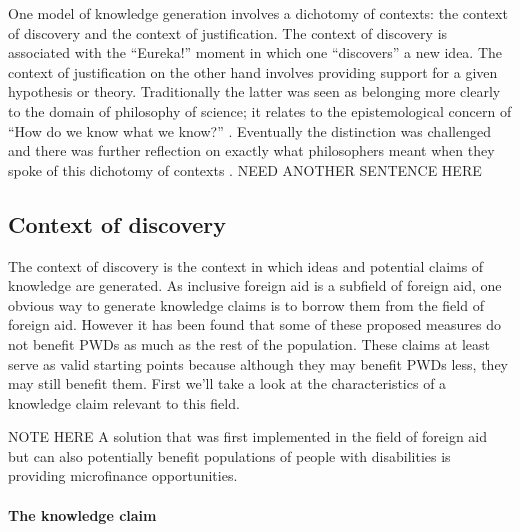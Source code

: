 \documentclass[a4paper]{article}
\begin{document}
One model of knowledge generation involves a dichotomy of contexts: the
context of discovery and the context of justification. The context of
discovery is associated with the ``Eureka!'' moment in which one ``discovers''
a new idea. The context of justification on the other hand involves providing
support for a given hypothesis or theory. Traditionally the latter was seen as
belonging more clearly to the domain of philosophy of science; it relates to
the epistemological concern of ``How do we know what we know?''
\citep{schickore2014scientific}. Eventually the distinction was challenged and
there was further reflection on exactly what philosophers meant when they
spoke of this dichotomy of contexts \citep{hoyningen2006context}. 
NEED ANOTHER SENTENCE HERE

\subsection{Context of discovery}

The context of discovery is the context in which ideas and potential claims of
knowledge are generated. As inclusive foreign aid is a subfield of foreign
aid, one obvious way to generate knowledge claims is to borrow them from the
field of foreign aid. However it has been found that some of these proposed
measures do not benefit PWDs as much as the rest of the population. These
claims at least serve as valid starting points because although they may
benefit PWDs less, they may still benefit them. First we'll take a look at the
characteristics of a knowledge claim relevant to this field.

NOTE HERE A solution that was first implemented in the field of foreign aid
but can also potentially benefit populations of people with disabilities is
providing microfinance opportunities.

\paragraph{The knowledge claim}
\end{document}
